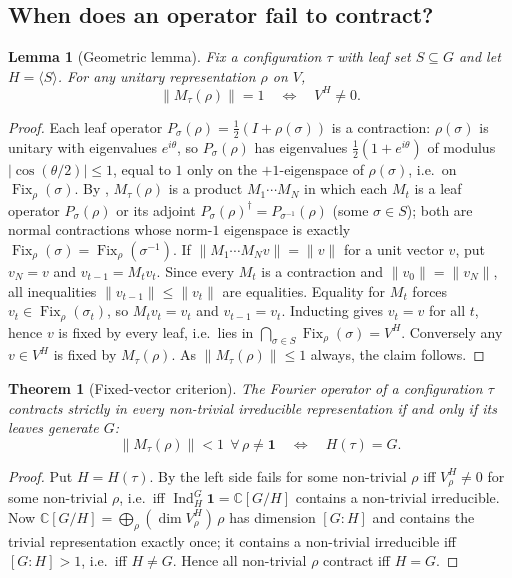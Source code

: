 \documentclass[11pt]{amsart}
\newtheorem{theorem}{Theorem}[section]
\newtheorem{lemma}[lemma]{Lemma}
\theoremstyle{definition}
\theoremstyle{remark}
\theoremstyle{plain}
\theoremstyle{plain}
\numberwithin{equation}{section}
\DeclareMathOperator{\Ind}{Ind}
\DeclareMathOperator{\Fix}{Fix}
\newcommand{\norm}[1]{\lVert #1 \rVert}
\newcommand{\abs}[1]{\lvert #1 \rvert}
\newcommand{\opn}[1]{\norm{#1}}
\newcommand{\C}{\mathbb{C}}
\begin{document}
\subsection{When does an operator fail to contract?}

\begin{lemma}[Geometric lemma]
\label{lem:geom}
Fix a configuration $\tau$ with leaf set $S\subseteq G$ and let
$H=\langle S\rangle$. For any unitary representation $\rho$ on $V$,
\[
\opn{M_\tau(\rho)}=1\quad\Longleftrightarrow\quad V^H\neq0.
\]
\end{lemma}

\begin{proof}
Each leaf operator $P_\sigma(\rho)=\tfrac12(I+\rho(\sigma))$ is a contraction: $\rho(\sigma)$
is unitary with eigenvalues $e^{i\theta}$, so $P_\sigma(\rho)$ has eigenvalues
$\tfrac12(1+e^{i\theta})$ of modulus $\abs{\cos(\theta/2)}\le1$, equal to $1$ only on the
$+1$-eigenspace of $\rho(\sigma)$, i.e.\ on $\Fix_\rho(\sigma)$. By ,
$M_\tau(\rho)$ is a product $M_1\cdots M_N$ in which each $M_t$ is a leaf operator
$P_\sigma(\rho)$ or its adjoint $P_\sigma(\rho)^{\dagger}=P_{\sigma^{-1}}(\rho)$ (some
$\sigma\in S$); both are normal contractions whose norm-$1$ eigenspace is exactly
$\Fix_\rho(\sigma)=\Fix_\rho(\sigma^{-1})$. If $\norm{M_1\cdots M_N v}=\norm{v}$ for a unit
vector $v$, put $v_N=v$ and $v_{t-1}=M_t v_t$. Since every $M_t$ is a contraction and
$\norm{v_0}=\norm{v_N}$, all inequalities $\norm{v_{t-1}}\le\norm{v_t}$ are equalities.
Equality for $M_t$ forces $v_t\in\Fix_\rho(\sigma_t)$, so $M_t v_t=v_t$ and
$v_{t-1}=v_t$. Inducting gives $v_t=v$ for all $t$, hence $v$ is fixed by every leaf, i.e.\
lies in $\bigcap_{\sigma\in S}\Fix_\rho(\sigma)=V^H$. Conversely any
$v\in V^H$ is fixed by $M_\tau(\rho)$. As $\opn{M_\tau(\rho)}\le1$ always, the claim
follows.
\end{proof}

\begin{theorem}[Fixed-vector criterion]
\label{thm:criterion}
The Fourier operator of a configuration $\tau$ contracts strictly in \emph{every}
non-trivial irreducible representation \emph{if and only if its leaves generate $G$}:
\[
\opn{M_\tau(\rho)}<1\ \ \forall\,\rho\neq\mathbf1
\quad\Longleftrightarrow\quad
H(\tau)=G .
\]
\end{theorem}

\begin{proof}
Put $H=H(\tau)$. By  the left side fails for some non-trivial $\rho$ iff $V_\rho^H\neq0$
for some non-trivial $\rho$, i.e.\ iff $\Ind_H^G\mathbf1=\C[G/H]$ contains a non-trivial
irreducible. Now $\C[G/H]=\bigoplus_\rho (\dim V_\rho^H)\,\rho$ has dimension $[G:H]$ and
contains the trivial representation exactly once; it contains a non-trivial irreducible
iff $[G:H]>1$, i.e.\ iff $H\neq G$. Hence all non-trivial $\rho$ contract iff $H=G$.
\end{proof}
\end{document}
